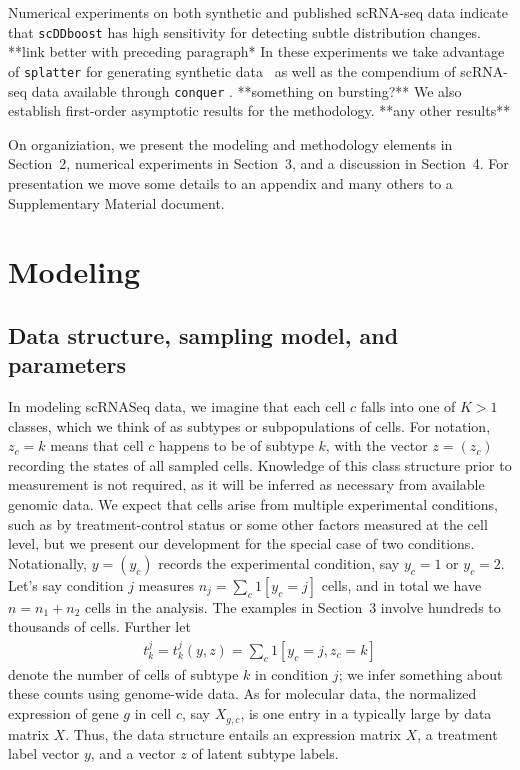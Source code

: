 \documentclass[aoas,preprint]{imsart}
\begin{document}
Numerical experiments  on both synthetic and published scRNA-seq data indicate that \verb+scDDboost+ has high
sensitivity for detecting subtle distribution changes. **link better with preceding paragraph*
  In these experiments we take advantage of
\verb+splatter+ for generating synthetic data~\citep{ref:Zappia} as well as the compendium of scRNA-seq
data available through \verb+conquer+ \citep{ref:Cq}.  **something on bursting?**
We also establish first-order asymptotic results for the methodology.    **any other results**

On organiziation, we present
the modeling and methodology elements in Section~2, numerical experiments in Section~3, and a discussion
in Section~4.  For presentation we move some details to an appendix and many others to a Supplementary 
Material document.



\section{Modeling}
\subsection{Data structure, sampling model, and parameters}

In modeling scRNASeq data, we
imagine that each cell $c$ falls into one of $K>1$ classes, which we think of as
subtypes or subpopulations of cells. For notation, $z_c=k$ means that cell $c$ happens to be of subtype $k$, with the vector $z=(z_c)$ recording
the states of all sampled cells.  Knowledge of this class structure
 prior to measurement is not required, as it will be inferred as necessary from
 available genomic data.   We expect that cells arise from multiple
experimental conditions, such as by treatment-control status or some other factors
 measured at the cell level, but we present our development for the special
case of two conditions.  Notationally, $y=(y_c)$ records the experimental condition, say $y_c=1$ or $y_c=2$.
 Let's say condition $j$ measures $n_j=\sum_{c} 1[y_c=j]$ cells,  and
in total we have $n=n_1+n_2$ cells in the analysis.  The examples in Section~3 involve hundreds to thousands of cells.
Further let \begin{eqnarray}
\label{eq:counts}
t^j_k = t^j_k(y,z) = \sum_c 1[y_c=j, z_c=k] 
\end{eqnarray}
denote the number of cells of subtype $k$ in condition $j$;
we infer something about these counts using genome-wide data.  As for molecular data, the 
normalized expression of gene $g$ in cell $c$, say $X_{g,c}$, is one entry
in a typically large {} by {} data matrix $X$.  Thus, the data structure entails an expression matrix
$X$, a treatment label vector $y$, and a vector $z$ of latent subtype labels.
\end{document}
